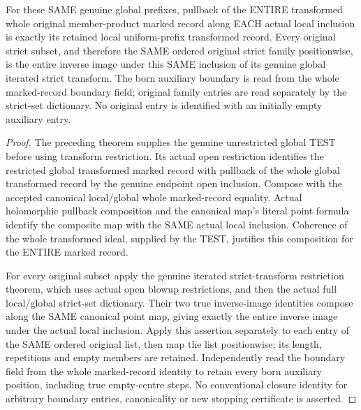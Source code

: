 \begin{theorem}
\label{hir:sharp-actual-curve-original-global-prefix-whole-readouts}
\leanok
For these SAME genuine global prefixes, pullback of the ENTIRE transformed
whole original member-product marked record along EACH actual local
inclusion is exactly its retained local uniform-prefix transformed record.
Every original strict subset, and therefore the SAME ordered original
strict family positionwise, is the entire inverse image under this SAME
inclusion of its genuine global iterated strict transform. The born
auxiliary boundary is read from the whole marked-record boundary field;
original family entries are read separately by the strict-set dictionary.
No original entry is identified with an initially empty auxiliary entry.
\end{theorem}
\begin{proof}
The preceding theorem supplies the genuine unrestricted global TEST before
using transform restriction. Its actual open restriction identifies the
restricted global transformed marked record with pullback of the whole
global transformed record by the genuine endpoint open inclusion. Compose
with the accepted canonical local/global whole marked-record equality.
Actual holomorphic pullback composition and the canonical map's literal
point formula identify the composite map with the SAME actual local
inclusion. Coherence of the whole transformed ideal, supplied by the TEST,
justifies this composition for the ENTIRE marked record.

For every original subset apply the genuine iterated strict-transform
restriction theorem, which uses actual open blowup restrictions, and then
the actual full local/global strict-set dictionary. Their two true
inverse-image identities compose along the SAME canonical point map,
giving exactly the entire inverse image under the actual local inclusion.
Apply this assertion separately to each entry of the SAME ordered original
list, then map the list positionwise; its length, repetitions and empty
members are retained. Independently read the boundary field from the whole
marked-record identity to retain every born auxiliary position, including
true empty-centre steps. No conventional closure identity for arbitrary
boundary entries, canonicality or new stopping certificate is asserted.
\end{proof}
